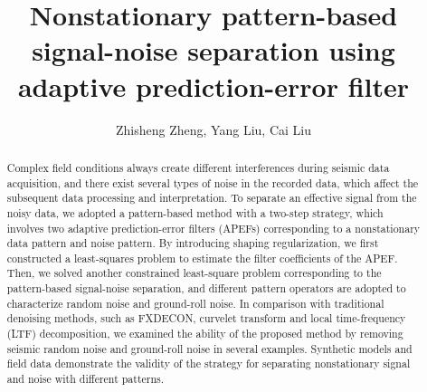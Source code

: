 
\title{Nonstationary pattern-based signal-noise separation using adaptive prediction-error filter}

\renewcommand{\thefootnote}{\fnsymbol{footnote}}


\address{
    \footnotemark[1] College of Geo-exploration Science and Technology,\\
    Jilin University, Changchun, China}

\author{Zhisheng Zheng\footnotemark[1], Yang Liu\footnotemark[1], Cai Liu\footnotemark[1]}


\maketitle


\begin{abstract}
    Complex field conditions always create different interferences during seismic data acquisition,
    and there exist several types of noise in the recorded data, which affect the subsequent data
    processing and interpretation. To separate an effective signal from the noisy data, we adopted
    a pattern-based method with a two-step strategy, which involves two adaptive prediction-error
    filters (APEFs) corresponding to a nonstationary data pattern and noise pattern. By introducing
    shaping regularization, we first constructed a least-squares problem to estimate the filter
    coefficients of the APEF. Then, we solved another constrained least-square problem corresponding
    to the pattern-based signal-noise separation, and different pattern operators are adopted to
    characterize random noise and ground-roll noise. In comparison with traditional denoising methods,
    such as FXDECON, curvelet transform and local time-frequency (LTF) decomposition, we examined
    the ability of the proposed method by removing seismic random noise and ground-roll noise in
    several examples. Synthetic models and field data demonstrate the validity of the strategy
    for separating nonstationary signal and noise with different patterns.

\end{abstract}

